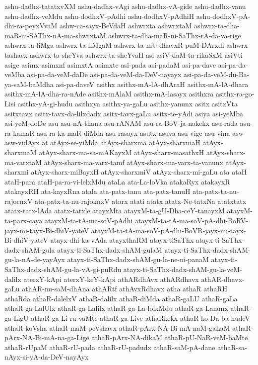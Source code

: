 {ashu-dadhx-tatatxvXM
ashu-dadhx-vAgi
ashu-dadhx-vA-gide
ashu-dadhx-vanu
ashu-dadhx-veMdu
ashu-dodhxV-pAdhi
ashu-dodhxV-pAdhiH
ashu-dodhxV-pA-dhi-ra-peyxVvaM
ashw-ca-sayx-BeVdaH
ashwrxta
ashwrxtaM
ashwrx-ta-dha-maR-ni-SAThx-nA-ma-shwrxtaM
ashwrx-ta-dha-maR-ni-SaThx-rA-da-va-rige
ashwrx-ta-liMga
ashwrx-ta-liMgaM
ashwrx-ta-mU-dhavxR-puM-DArxdi
ashwrx-tashacx
ashwrx-ta-sheYva
ashwrx-ta-sheYvaH
asi
asiV-daM-ta-rikaSxM
asiVti
asige
asimx
asimxnf
asimxtA
asimxte
asi-pada
asi-padaM
asi-pa-dave
asi-pa-da-veMba
asi-pa-da-veM-daDe
asi-pa-da-veM-da-DeV-nayayx
asi-pa-da-veM-du-Ba-ya-saM-baMdha
asi-pa-daveV
asithx
asithx-mA-lA-dhAraH
asithx-mA-lA-dhara
asithx-mA-lA-dha-ra-nAde
asithx-mAlaM
asithx-mA-lasayx
asithxra
asithx-ra-go-Lisi
asithx-yA-gi-hudu
asithxya
asithx-ya-gaLu
asithx-yanunx
asitx
asitxVta
asitxtavx
asitx-tavx-da-lilxdadx
asitx-tavx-gaLu
asitx-te-yAdi
asiya
asi-yeMba
asi-yeM-doDe
asu
asu-nA-thana
asu-rANAM
asu-ra-BoV-ja-nakekx
asu-rada
asu-ra-kamaR
asu-ra-ka-maR-diMda
asu-rasayx
asutx
asuva
asu-vige
asu-vina
asw
asw-vidAyx
at
atAyx-se-yiMda
atAyx-sharxma
atAyx-sharxmaH
atAyx-sharxmaM
atAyx-sharx-ma-sa-mAKayxM
atAyx-sharx-masathxH
atAyx-sharx-ma-varxtaM
atAyx-sharx-ma-varx-tamf
atAyx-sharx-ma-varx-ta-vanunx
atAyx-sharxmi
atAyx-sharx-miBayxH
atAyx-sharxmiV
atAyx-sharx-mi-gaLu
ata
ataH
ataH-para
ataH-pa-ra-vi-lelxMdu
ataLa
ata-La-loVka
atakaRyx
atakayxR
atakayxRH
ata-kayxRna
atala
ata-patx-tanu
ata-patx-tanuH
ata-patx-ta-nu-rajocnxV
ata-patx-ta-nu-rajoknxV
atarx
atati
atatx
atatx-Ne-tatxNa
atatxtatx
atatx-tatx-lAda
atatx-tatxle
atayxMta
atayxM-ta-gU-Dha-ceY-tanayxM
atayxM-ta-parx-caya
atayxM-ta-tA-ma-soV-pAdhi
atayxM-ta-tA-ma-soV-pA-dhi-BoRV-jayx-mi-tayx-Bi-dhiV-yateV
atayxM-ta-tA-ma-soV-pA-dhi-BoVR-jayx-mi-tayx-Bi-dhiV-yateV
atayx-dhi-ka-vAda
atayxthaRM
atayx-tiSaThx
atayx-ti-SaThx-dadx-shAM-gula
atayx-ti-SaThx-dadx-shAM-gulaM
atayx-ti-SaThx-dadx-shAM-gu-la-nA-de-yayAyx
atayx-ti-SaThx-dadx-shAM-gu-la-ne-ni-panaM
atayx-ti-SaThx-dadx-shAM-gu-la-vA-gi-puRdu
atayx-ti-SaThx-dadx-shAM-gu-la-veM-dalilx
aterxY-kApi
aterxY-keY-kApi
athARdhAvx
athARdhavx
athAR-dhavx-gaLu
athAR-nu-saM-dhAna
athARtf
athAvxRdhavx
atha
athaR
athaRH
athaRda
athaR-dalelxV
athaR-dalilx
athaR-diMda
athaR-gaLU
athaR-gaLa
athaR-ga-LalUlx
athaR-ga-Lalilx
athaR-ga-La-lolxMdu
athaR-ga-Lanunx
athaR-ga-LigU
athaR-ga-Li-ru-vaMte
athaR-ga-Live
athaRkekx
athaR-ko-Da-ba-hudeV
athaR-koVsha
athaR-maM-peVshavx
athaR-pArx-NA-Bi-mA-naM-gaLaM
athaR-pArx-NA-Bi-mA-na-ga-Lige
athaR-pArx-NA-dikaM
athaR-pU-NaR-veM-baMte
athaR-rUpaM
athaR-rU-pada
athaR-rU-padudx
athaR-saM-pA-dane
athaR-sa-nAyx-si-yA-da-DeV-nayAyx
}
